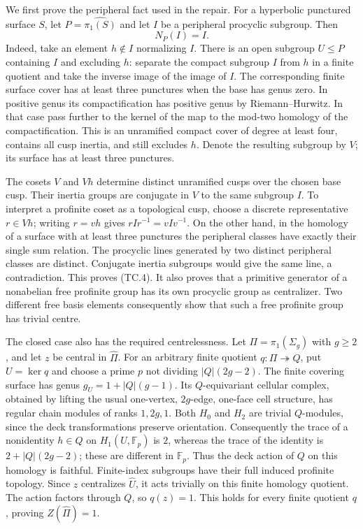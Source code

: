 We first prove the peripheral fact used in the repair.  For a hyperbolic
punctured surface $S$, let $P=\widehat{\pi_1(S)}$ and let $I$ be a
peripheral procyclic subgroup.  Then
\[
                         N_P(I)=I.                          \tag{TC.4}
\]
Indeed, take an element $h\notin I$ normalizing $I$.  There is an open
subgroup $U\leq P$ containing $I$ and excluding $h$: separate the
compact subgroup $I$ from $h$ in a finite quotient and take the inverse
image of the image of $I$.  The corresponding finite surface cover
has at least three punctures when the base has genus zero.  In positive
genus its compactification has positive genus by Riemann--Hurwitz.
In that case pass further to the kernel of the map to the mod-two
homology of the compactification.  This is an unramified compact cover
of degree at least four, contains all cusp inertia, and still excludes
$h$.  Denote the resulting subgroup by $V$; its surface has at least
three punctures.

The cosets $V$ and $Vh$ determine distinct unramified cusps over the
chosen base cusp.  Their inertia groups are conjugate in $V$ to the
same subgroup $I$.  To interpret a profinite coset as a topological
cusp, choose a discrete representative $r\in Vh$; writing $r=vh$
gives $rIr^{-1}=vIv^{-1}$.  On the other hand, in the homology of a
surface with at least three punctures the peripheral classes have
exactly their single sum relation.  The procyclic lines generated by
two distinct peripheral classes are distinct.  Conjugate inertia
subgroups would give the same line, a contradiction.  This proves
(TC.4).  It also proves that a primitive generator of a nonabelian
free profinite group has its own procyclic group as centralizer.
Two different free basis elements consequently show that such a free
profinite group has trivial centre.

The closed case also has the required centrelessness.  Let
$\Pi=\pi_1(\Sigma_g)$ with $g\geq2$, and let $z$ be central in
$\widehat\Pi$.  For an arbitrary finite quotient $q:\Pi\twoheadrightarrow Q$,
put $U=\ker q$ and choose a prime $p$ not dividing
$|Q|(2g-2)$.  The finite covering surface has genus
$g_U=1+|Q|(g-1)$.  Its $Q$-equivariant cellular complex, obtained by
lifting the usual one-vertex, $2g$-edge, one-face cell structure, has
regular chain modules of ranks $1,2g,1$.  Both $H_0$ and $H_2$ are
trivial $Q$-modules, since the deck transformations preserve orientation.
Consequently the trace of a nonidentity $h\in Q$ on
$H_1(U,\mathbb F_p)$ is $2$, whereas the trace of the identity is
$2+|Q|(2g-2)$; these are different in $\mathbb F_p$.  Thus the deck
action of $Q$ on this homology is faithful.  Finite-index subgroups
have their full induced profinite topology.  Since $z$ centralizes
$\widehat U$, it acts trivially on this finite homology quotient.
The action factors through $Q$, so $q(z)=1$.  This holds for every
finite quotient $q$, proving $Z(\widehat\Pi)=1$.

